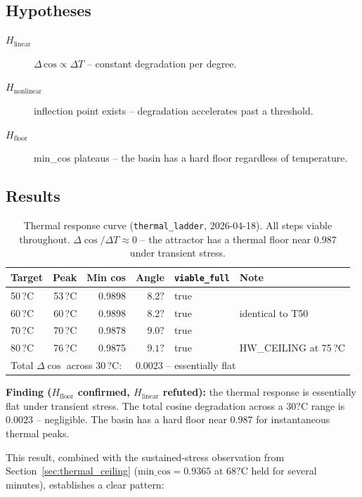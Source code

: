 \documentclass[11pt, a4paper]{article}
\begin{document}
\subsection{Hypotheses}

\begin{description}
  \item[$H_\text{linear}$] $\Delta\,\text{cos} \propto \Delta T$ -- constant
        degradation per degree.
  \item[$H_\text{nonlinear}$] inflection point exists -- degradation
        accelerates past a threshold.
  \item[$H_\text{floor}$] min\_cos plateaus -- the basin has a hard floor
        regardless of temperature.
\end{description}

\subsection{Results}

\begin{table}[h]
\centering
\begin{tabular}{lrrrll}
\toprule
Target & Peak & Min cos & Angle & \texttt{viable\_full} & Note \\
\midrule
50\,?C & 53\,?C & 0.9898 & $8.2?$ & true & \\
60\,?C & 60\,?C & 0.9898 & $8.2?$ & true & identical to T50 \\
70\,?C & 70\,?C & 0.9878 & $9.0?$ & true & \\
80\,?C & 76\,?C & 0.9875 & $9.1?$ & true & HW\_CEILING at 75\,?C \\
\midrule
\multicolumn{3}{l}{Total $\Delta\cos$ across 30\,?C:} & \multicolumn{3}{l}{$0.0023$ -- essentially flat} \\
\bottomrule
\end{tabular}
\caption{Thermal response curve (\texttt{thermal\_ladder}, 2026-04-18).
All steps viable throughout.
$\Delta\cos/\Delta T \approx 0$ -- the attractor has a thermal floor near $0.987$
under transient stress.}
\label{tab:ladder}
\end{table}

\textbf{Finding ($H_\text{floor}$ confirmed, $H_\text{linear}$ refuted):}
the thermal response is essentially flat under transient stress.
The total cosine degradation across a $30?\mathrm{C}$ range is $0.0023$ --
negligible.
The basin has a hard floor near $0.987$ for instantaneous thermal peaks.

This result, combined with the sustained-stress observation from
Section~\ref{sec:thermal_ceiling} ($\text{min\_cos} = 0.9365$ at $68?\mathrm{C}$
held for several minutes), establishes a clear pattern:
\end{document}
